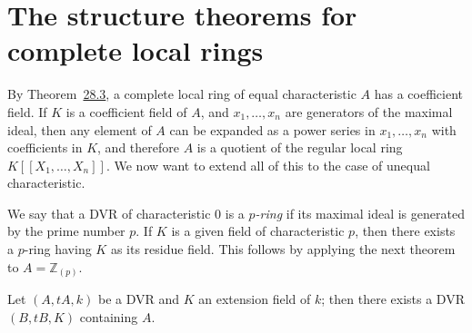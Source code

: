 \section{The structure theorems for complete local rings}\label{sec:29}

By Theorem~\hyperref[thm:28.3]{28.3}, a complete local ring of equal characteristic $A$ has a
coefficient field. If $K$ is a coefficient field of $A$, and $x_1, \ldots, x_n$ are generators
of the maximal ideal, then any element of $A$ can be expanded as a power series
in $x_1, \ldots, x_n$ with coefficients in $K$, and therefore $A$ is a quotient of the
regular local ring $K[[X_1, \ldots, X_n]]$. We now want to extend all of this to the
case of unequal characteristic.

We say that a DVR of characteristic $0$ is a \emph{$p$-ring} if its maximal ideal is
generated by the prime number $p$. If $K$ is a given field of characteristic $p$, then
there exists a $p$-ring having $K$ as its residue field. This follows by applying the
next theorem to $A = \mathbb{Z}_{(p)}$.

\begin{theorem}\label{thm:29.1}
Let $(A, tA, k)$ be a DVR and $K$ an extension field of $k$; then there exists a DVR
$(B, tB, K)$ containing $A$.
\end{theorem}

